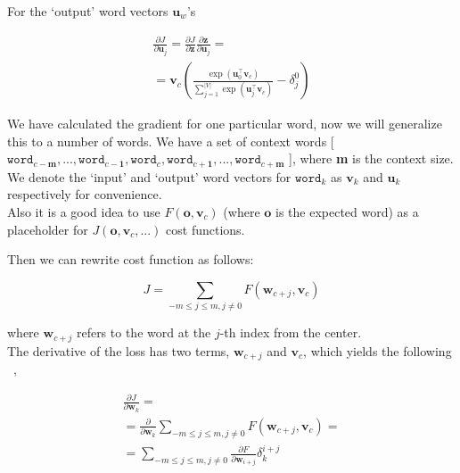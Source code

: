 \noindent For the `output' word vectors ${\boldsymbol u}_{w}$'s

\begin{equation}
	\begin{multlined}
	\frac{\partial J}{\partial{\boldsymbol u}_{j}} = \frac{\partial J}{\partial{{\boldsymbol z}}}\frac{\partial{{\boldsymbol z}}}{\partial{\boldsymbol u}_{j}} =\\
	= {\boldsymbol v}_{c}\left(\frac{\exp{({\boldsymbol u}^{\top}_{0}{\boldsymbol v}_{c})}}{\sum^{\vert{V}\vert}_{j=1}\exp{({\boldsymbol u}^{\top}_{j}{\boldsymbol v}_{c})}} - \delta^{0}_{j}\right)
	\end{multlined}
\end{equation}

\noindent We have calculated the gradient for one particular word, now we will generalize this to a number of words. We have a set of context words [$\texttt{word}_{c-\textbf{m}},...,\texttt{word}_{c-\textbf{1}},\texttt{word}_{c},\texttt{word}_{c+\textbf{1}},...,\texttt{word}_{c+\textbf{m}}$ ], where \textbf{m} is the context size. We denote the `input' and `output' word vectors for $\texttt{word}_{k}$ as ${\boldsymbol v}_{k}$ and ${\boldsymbol u}_{k}$ respectively for
convenience. \\

\noindent Also it is a good idea to use $F({\boldsymbol o}, {\boldsymbol v}_{c})$ (where ${\boldsymbol o}$ is the expected word) as a placeholder for $J({\boldsymbol o}, {\boldsymbol v}_{c}, ...)$ cost functions.

\noindent Then we can rewrite cost function as follows:

\begin{equation}
J =   \sum_{-m\le j\le m, j\neq0}F({\boldsymbol w}_{c+j}, {\boldsymbol v}_{c})
\end{equation}

where ${\boldsymbol w}_{c+j}$ refers to the word at the $j$-th index from the center.\\

The derivative of the loss has two terms, ${\boldsymbol w}_{c+j}$ and ${\boldsymbol v}_{c}$, which yields the following ~\cite{assignment1},

\begin{equation}
	\begin{multlined}
	\frac{\partial{J}}{\partial{\boldsymbol w}_{k}} = \\ =\frac{\partial}{\partial{\boldsymbol w}_{k}}\sum_{-m\le j\le m, j\neq0}F({\boldsymbol w}_{c+j}, {\boldsymbol v}_{c})= \\
	= \sum_{-m\le j\le m, j\neq0} \frac{\partial{F}}{\partial{\boldsymbol w}_{i+j}}\delta^{i+j}_{k}
	\end{multlined}
\end{equation}

